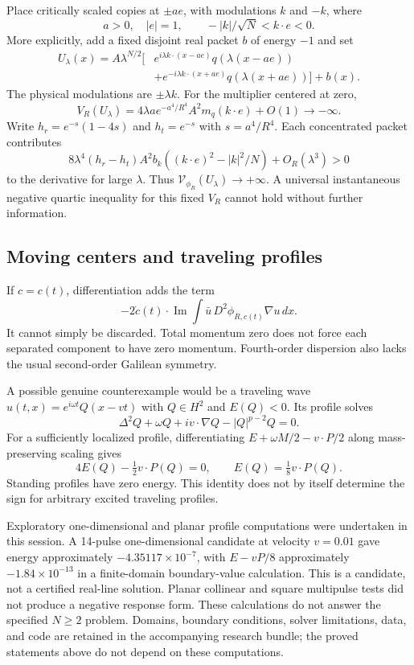 \documentclass[11pt,a4paper]{article}
\theoremstyle{remark}\newtheorem{remark}[theorem]{Remark}
\newcommand{\dd}{\,dx}
\DeclareMathOperator{\Ima}{Im}
\begin{document}
Place critically scaled copies at $\pm ae$, with modulations $k$ and $-k$, where
\[
 a>0,\quad |e|=1,\qquad -|k|/\sqrt N<k\cdot e<0.
\]
More explicitly, add a fixed disjoint real packet $b$ of energy $-1$ and set
\begin{align*}
 U_\lambda(x)=A\lambda^{N/2}\big[&e^{i\lambda k\cdot(x-ae)}q(\lambda(x-ae))\\
 &+e^{-i\lambda k\cdot(x+ae)}q(\lambda(x+ae))\big]+b(x).
\end{align*}
The physical modulations are $\pm\lambda k$. For the multiplier centered at zero,
\[
 V_R(U_\lambda)=4\lambda a e^{-a^4/R^4}A^2m_q(k\cdot e)+O(1)\to-\infty.
\]
Write $h_r=e^{-s}(1-4s)$ and $h_t=e^{-s}$ with $s=a^4/R^4$. Each concentrated packet contributes
\[
 8\lambda^4(h_r-h_t)A^2b_k
 \left((k\cdot e)^2-|k|^2/N\right)+O_R(\lambda^3)>0
\]
to the derivative for large $\lambda$. Thus $\mathcal V_{\phi_R}(U_\lambda)\to+\infty$. A universal instantaneous negative quartic inequality for this fixed $V_R$ cannot hold without further information.

\subsection{Moving centers and traveling profiles}
If $c=c(t)$, differentiation adds the term
\[
 -2\dot c(t)\cdot\Ima\int\bar u\,D^2\phi_{R,c(t)}\nabla u\dd.
\]
It cannot simply be discarded. Total momentum zero does not force each separated component to have zero momentum. Fourth-order dispersion also lacks the usual second-order Galilean symmetry.

A possible genuine counterexample would be a traveling wave
$u(t,x)=e^{i\omega t}Q(x-vt)$ with $Q\in H^2$ and $E(Q)<0$. Its profile solves
\[
 \Delta^2Q+\omega Q+i v\cdot\nabla Q-|Q|^{p-2}Q=0.
\]
For a sufficiently localized profile, differentiating
$E+\omega M/2-v\cdot P/2$ along mass-preserving scaling gives
\[
 4E(Q)-\tfrac12v\cdot P(Q)=0,
 \qquad E(Q)=\tfrac18v\cdot P(Q).
\]
Standing profiles have zero energy. This identity does not by itself determine the sign for arbitrary excited traveling profiles.

Exploratory one-dimensional and planar profile computations were undertaken in this session. A 14-pulse one-dimensional candidate at velocity $v=0.01$ gave energy approximately $-4.35117\times10^{-7}$, with $E-vP/8$ approximately $-1.84\times10^{-13}$ in a finite-domain boundary-value calculation. This is a candidate, not a certified real-line solution. Planar collinear and square multipulse tests did not produce a negative response form. These calculations do not answer the specified $N\ge2$ problem. Domains, boundary conditions, solver limitations, data, and code are retained in the accompanying research bundle; the proved statements above do not depend on these computations.
\end{document}
